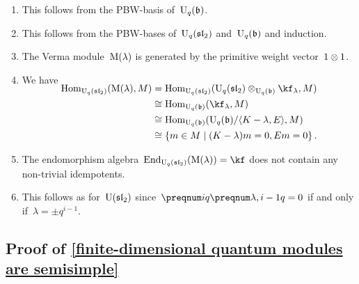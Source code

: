\documentclass[a4paper, 11pt, oneside]{scrartcl}
\begin{document}
\begin{enumerate}
  \item
    This follows from the PBW-basis of~$\operatorname{U}_q(\mathfrak{b})$.
  \item
    This follows from the PBW-bases of~$\operatorname{U}_q(\mathfrak{sl}_2)$ and~$\operatorname{U}_q(\mathfrak{b})$ and induction.
  \item
    The Verma module~$\operatorname{M}(\lambda)$ is generated by the primitive weight vector~$1 \otimes 1$.
  \item
    We have
    \begin{align*}
      \SwapAboveDisplaySkip
      \Hom_{\Univ_q(\sllie_2)}( \verma(\lambda), M )
      &=
      \Hom_{\Univ_q(\sllie_2)}( \Univ_q(\sllie_2) \tensor_{\Univ_q(\blie)} \kf_{\lambda}, M )
      \\
      &\cong
      \Hom_{\Univ_q(\blie)}( \kf_\lambda, M )
      \\
      &\cong
      \Hom_{\Univ_q(\blie)}( \Univ_q(\blie) / \gen{K - \lambda, E}, M)
      \\
      &\cong
      \{
        m \in M
      \suchthat
        (K - \lambda) m = 0,
        E m = 0
      \} \,.
    \end{align*}
  \item
    The endomorphism algebra~$\End_{\Univ_q(\sllie_2)}( \verma(\lambda) ) = \kf$ does not contain any non-trivial idempotents.
  \item
    This follows as for~$\operatorname{U}(\mathfrak{sl}_2)$ since~$\qnum{i} \qnum{\lambda, i-1} = 0$ if and only if~$\lambda = \pm q^{i-1}$.
\end{enumerate}


\subsection{Proof of \cref{finite-dimensional quantum modules are semisimple}}
\label{proof of finite-dimensional quantum modules are semisimple}
\end{document}
